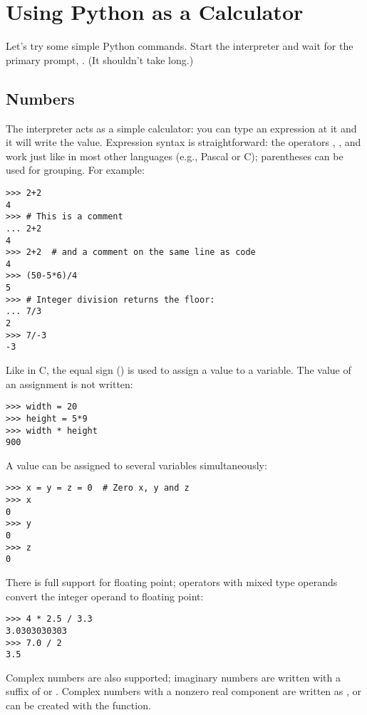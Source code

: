 \documentclass{manual}
\begin{document}
\section{Using Python as a Calculator \label{calculator}}

Let's try some simple Python commands.  Start the interpreter and wait
for the primary prompt, \samp{>>> }.  (It shouldn't take long.)

\subsection{Numbers \label{numbers}}

The interpreter acts as a simple calculator: you can type an
expression at it and it will write the value.  Expression syntax is
straightforward: the operators \code{+}, \code{-}, \code{*} and \code{/}
work just like in most other languages (e.g., Pascal or C); parentheses
can be used for grouping.  For example:

\begin{verbatim}
>>> 2+2
4
>>> # This is a comment
... 2+2
4
>>> 2+2  # and a comment on the same line as code
4
>>> (50-5*6)/4
5
>>> # Integer division returns the floor:
... 7/3
2
>>> 7/-3
-3
\end{verbatim}

Like in C, the equal sign (\character{=}) is used to assign a value to a
variable.  The value of an assignment is not written:

\begin{verbatim}
>>> width = 20
>>> height = 5*9
>>> width * height
900
\end{verbatim}
%
A value can be assigned to several variables simultaneously:

\begin{verbatim}
>>> x = y = z = 0  # Zero x, y and z
>>> x
0
>>> y
0
>>> z
0
\end{verbatim}
%
There is full support for floating point; operators with mixed type
operands convert the integer operand to floating point:

\begin{verbatim}
>>> 4 * 2.5 / 3.3
3.0303030303
>>> 7.0 / 2
3.5
\end{verbatim}
%
Complex numbers are also supported; imaginary numbers are written with
a suffix of  or .  Complex numbers with a nonzero
real component are written as , or can
be created with the  function.
\end{document}
